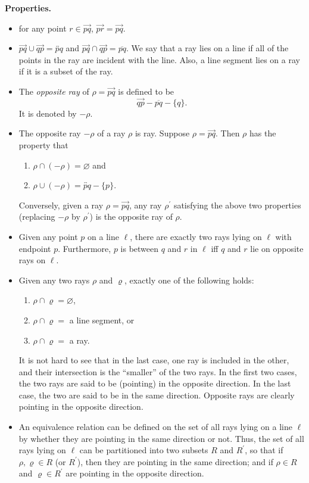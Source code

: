 \documentclass[12pt]{article}
\renewcommand{\line}[1]{\overleftrightarrow{#1}}
\newcommand{\ray}[1]{\overrightarrow{#1}}
\begin{document}
\textbf{Properties.}
\begin{itemize}
\item for any point $r\in\ray{pq}$, $\ray{pr}=\ray{pq}$.
\item $\ray{pq}\cup\ray{qp}=\line{pq}$ and $\ray{pq}\cap\ray{qp}=\overline{pq}$.  We say that a ray lies on a line if all of the points in the ray are incident with the line.  Also, a line segment lies on a ray if it is a subset of the ray.
\item The \emph{opposite ray} of $\rho=\ray{pq}$ is defined to be $$\ray{qp}-\overline{pq}-\lbrace q\rbrace.$$  It is denoted by $-\rho$.
\item The opposite ray $-\rho$ of a ray $\rho$ is ray.  Suppose $\rho=\ray{pq}$.  Then $\rho$ has the property that
\begin{enumerate}
\item $\rho\cap(-\rho)=\varnothing$ and
\item $\rho\cup(-\rho)=\line{pq}-\lbrace p\rbrace$.
\end{enumerate}
Conversely, given a ray $\rho=\ray{pq}$, any ray $\rho^{\prime}$ satisfying the above two properties (replacing $-\rho$ by $\rho^{\prime}$) is the opposite ray of $\rho$.
\item Given any point $p$ on a line $\ell$, there are exactly two rays lying on $\ell$ with endpoint $p$.  Furthermore, $p$ is between $q$ and $r$ in $\ell$ iff $q$ and $r$ lie on opposite rays on $\ell$.
\item Given any two rays $\rho$ and $\varrho$, exactly one of the following holds:
\begin{enumerate}
\item $\rho\cap\varrho=\varnothing$,
\item $\rho\cap\varrho=$ a line segment, or
\item $\rho\cap\varrho=$ a ray.
\end{enumerate}
It is not hard to see that in the last case, one ray is included in the other, and their intersection is the ``smaller'' of the two rays.  In the first two cases, the two rays are said to be (pointing) in the opposite direction. In the last case, the two are said to be in the same direction. Opposite rays are clearly pointing in the opposite direction.
\item An equivalence relation can be defined on the set of all rays lying on a line $\ell$ by whether they are pointing in the same direction or not.  Thus, the set of all rays lying on $\ell$ can be partitioned into two subsets $R$ and $R^{\prime}$, so that if $\rho,\varrho\in R$ (or $R^{\prime}$), then they are pointing in the same direction; and if $\rho\in R$ and $\varrho\in R^{\prime}$ are pointing in the opposite direction.

\end{itemize}
\end{document}
